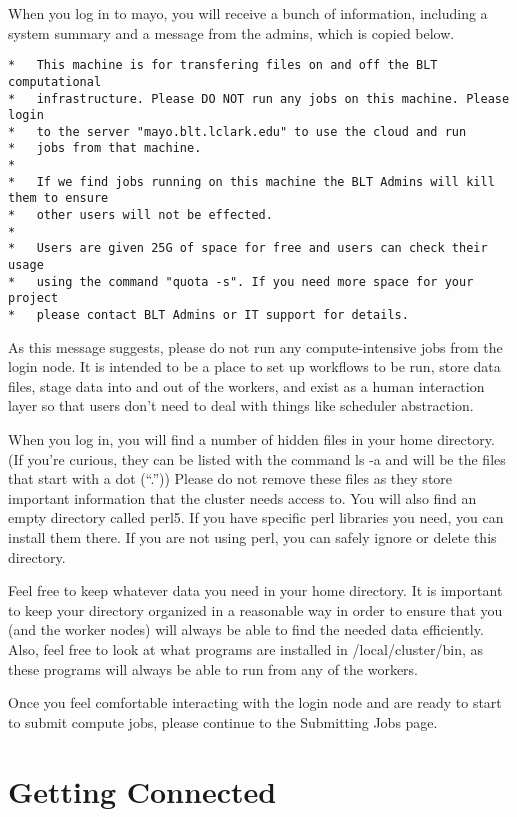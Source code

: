\documentclass[]{book}
\begin{document}
When you log in to mayo, you will receive a bunch of information,
including a system summary and a message from the admins, which is
copied below.

\begin{verbatim}
*   This machine is for transfering files on and off the BLT computational
*   infrastructure. Please DO NOT run any jobs on this machine. Please login 
*   to the server "mayo.blt.lclark.edu" to use the cloud and run
*   jobs from that machine. 
*
*   If we find jobs running on this machine the BLT Admins will kill them to ensure
*   other users will not be effected.
*
*   Users are given 25G of space for free and users can check their usage
*   using the command "quota -s". If you need more space for your project
*   please contact BLT Admins or IT support for details.
\end{verbatim}

As this message suggests, please do not run any compute-intensive jobs
from the login node. It is intended to be a place to set up workflows to
be run, store data files, stage data into and out of the workers, and
exist as a human interaction layer so that users don't need to deal with
things like scheduler abstraction.

When you log in, you will find a number of hidden files in your home
directory. (If you're curious, they can be listed with the command ls -a
and will be the files that start with a dot (``.'')) Please do not
remove these files as they store important information that the cluster
needs access to. You will also find an empty directory called perl5. If
you have specific perl libraries you need, you can install them there.
If you are not using perl, you can safely ignore or delete this
directory.

Feel free to keep whatever data you need in your home directory. It is
important to keep your directory organized in a reasonable way in order
to ensure that you (and the worker nodes) will always be able to find
the needed data efficiently. Also, feel free to look at what programs
are installed in /local/cluster/bin, as these programs will always be
able to run from any of the workers.

Once you feel comfortable interacting with the login node and are ready
to start to submit compute jobs, please continue to the Submitting Jobs
page.

\chapter{Getting Connected}\label{getting-connected}
\end{document}
